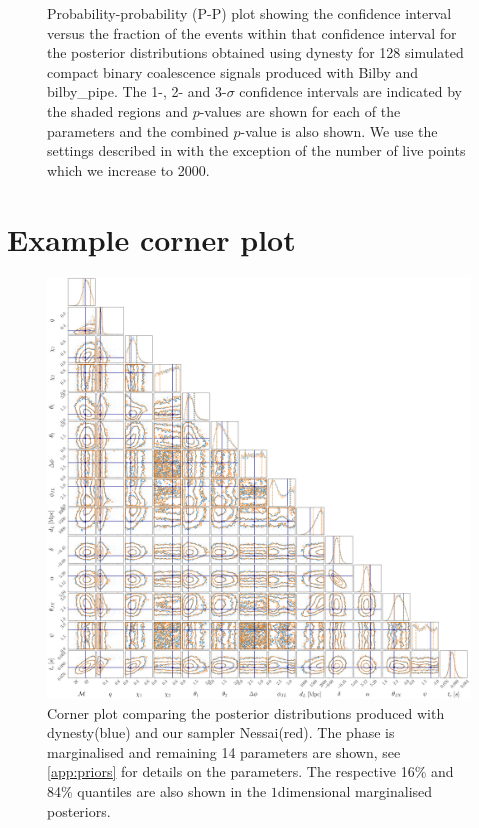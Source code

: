 \documentclass[%
 reprint,
nofootinbib,
 amsmath,amssymb,
 aps,
 prd,
]{revtex4-2}
\newcommand{\ndimensional}[1]{$#1$\nobreakdash\discretionary{-}{-}{-}dimensional}
\newcommand{\nessai}{{\sc Nessai}\xspace}
\newcommand{\bilby}{{\sc Bilby}\xspace}
\newcommand{\bilbypipe}{{\sc bilby\_pipe}\xspace}
\newcommand{\dynesty}{{\sc dynesty}\xspace}
\newcommand{\doublefigwidth}{17.2cm}
\begin{document}
\begin{widetext}
\begin{figure}[h]
    \caption{Probability-probability (P-P) plot showing the confidence interval versus the fraction of the events within that confidence interval for the posterior distributions obtained using \dynesty for 128 simulated compact binary coalescence signals produced with \bilby and \bilbypipe. The 1-, 2- and 3-$\sigma$ confidence intervals are indicated by the shaded regions and $p$-values are shown for each of the parameters and the combined $p$-value is also shown. We use the settings described in \cite{Romero-Shaw:2020} with the exception of the number of live points which we increase to 2000.}
    \label{fig:pp_plot_dynesty}
\end{figure}

\clearpage

\section{Example corner plot}\label{app:corner}

\begin{figure}[h]
    \centering
    \includegraphics[width=\doublefigwidth]{figures/corner.pdf}
    \caption{Corner plot comparing the posterior distributions produced with \dynesty (blue) and our sampler \nessai (red). The phase is marginalised and remaining 14 parameters are shown, see \cref{app:priors} for details on the parameters. The respective 16\% and 84\% quantiles are also shown in the \protect\ndimensional{1} marginalised posteriors.}
    \label{fig:corner}
\end{figure}

\end{widetext}

\clearpage


\end{document}
